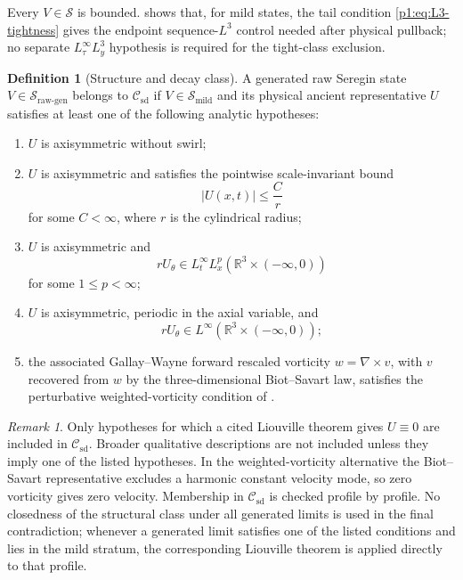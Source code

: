 \documentclass[11pt]{amsart}
\theoremstyle{plain}
\theoremstyle{definition}
\newtheorem{definition}[definition]{Definition}
\theoremstyle{remark}
\newtheorem{remark}[remark]{Remark}
\numberwithin{equation}{section}
\newcommand{\R}{\mathbb R}
\newcommand{\calS}{\mathcal S}
\newcommand{\calC}{\mathcal C}
\begin{document}
Every \(V\in\calS\) is bounded.   shows that, for
mild states, the tail condition \eqref{p1:eq:L3-tightness} gives the endpoint
sequence-\(L^3\) control needed after physical pullback; no separate
\(L^\infty_\tau L^3_y\) hypothesis is required for the tight-class exclusion.

\begin{definition}[Structure and decay class]
\label{p1:def:known-structure-decay-class}
A generated raw Seregin state \(V\in\calS_{\mathrm{raw\text{-}gen}}\) belongs
to \(\calC_{\mathrm{sd}}\) if \(V\in\calS_{\mathrm{mild}}\) and its physical
ancient representative \(U\) satisfies at least one of the following analytic
hypotheses:
\begin{enumerate}[label=(\roman*)]
\item \(U\) is axisymmetric without swirl;
\item \(U\) is axisymmetric and satisfies the pointwise scale-invariant bound
\[
   |U(x,t)|\le \frac{C}{r}
\]
for some \(C<\infty\), where \(r\) is the cylindrical radius;
\item \(U\) is axisymmetric and
\[
   rU_\theta\in L_t^\infty L_x^p(\R^3\times(-\infty,0))
\]
for some \(1\le p<\infty\);
\item \(U\) is axisymmetric, periodic in the axial variable, and
\[
   rU_\theta\in L^\infty(\R^3\times(-\infty,0));
\]
\item the associated Gallay--Wayne forward rescaled vorticity
\(w=\nabla\times v\), with \(v\) recovered from \(w\) by the
three-dimensional Biot--Savart law, satisfies the perturbative
weighted-vorticity condition of
.
\end{enumerate}
\end{definition}

\begin{remark}
Only hypotheses for which a cited Liouville theorem gives \(U\equiv0\) are
included in \(\calC_{\mathrm{sd}}\).  Broader qualitative descriptions are
not included unless they imply one of the listed hypotheses.  In the
weighted-vorticity alternative the Biot--Savart representative excludes a
harmonic constant velocity mode, so zero vorticity gives zero velocity.
Membership in \(\calC_{\mathrm{sd}}\) is checked profile by profile.  No
closedness of the structural class under all generated limits is used in the
final contradiction; whenever a generated limit satisfies one of the listed
conditions and lies in the mild stratum, the corresponding Liouville theorem is
applied directly to that profile.
\end{remark}
\end{document}
